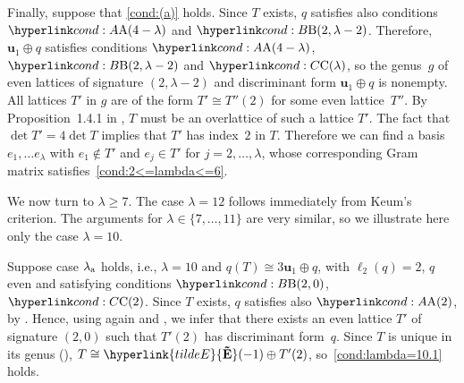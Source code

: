 \documentclass[a4paper]{amsart}
\theoremstyle{definition}
\theoremstyle{plain}
\DeclareMathOperator{\sign}{sign}
\newcommand{\bE}{\mathbf{E}}
\newcommand{\bU}{\mathbf{U}}
\newcommand{\bu}{\mathbf{u}}
\newcommand{\Etilde}{\hyperlink{tildeE}{\mathbf{\tilde{E}}}}
\begin{document}
Finally, suppose that \ref{cond:(a)} holds. 
Since \(T\) exists, \(q\) satisfies also conditions \(\condA{4 - \lambda}\) and \(\condB{2, \lambda - 2}\). Therefore, \(\bu_1 \oplus q\) satisfies conditions \(\condA{4 - \lambda}\), \(\condB{2, \lambda - 2}\) and \(\condC{\lambda}\), so the genus~\(g\) of even lattices of signature \((2, \lambda - 2)\) and discriminant form \(\bu_1\oplus q\) is nonempty.
All lattices \(T'\) in \(g\) are of the form \(T' \cong T''(2)\) for some even lattice~\(T''\).
By Proposition~1.4.1 in \cite{Nikulin:int.sym.bilinear.forms}, \(T\) must be an overlattice of such a lattice \(T'\). 
The fact that \(\det T' = 4 \det T\) implies that \(T'\) has index~\(2\) in \(T\). 
Therefore we can find a basis \(e_1, \ldots e_ \lambda\) with \(e_1 \notin T'\) and \(e_j \in T'\) for \(j = 2,\ldots, \lambda\), whose corresponding Gram matrix satisfies~\ref{cond:2<=lambda<=6}.

We now turn to \(\lambda \geq 7\).
The case \(\lambda = 12\) follows immediately from Keum's criterion.
The arguments for \(\lambda \in \{7,\ldots,11\}\) are very similar, so we illustrate here only the case \(\lambda = 10\).

Suppose case \(\lambda_{\rm a}\) holds, i.e., \(\lambda = 10\) and \(q(T) \cong 3\bu_1 \oplus q\), with \(\ell_2(q) = 2\), \(q\) even and satisfying conditions \(\condB{2, 0}\), \(\condC{2}\). 
Since \(T\) exists, \(q\) satisfies also \(\condA{2}\), by . 
Hence, using  again and , we infer that there exists an even lattice \(T'\) of signature \((2,0)\) such that \(T'(2)\) has discriminant form~\(q\). 
Since \(T\) is unique in its genus (), \(T \cong \Etilde(-1) \oplus T'(2)\), so~\ref{cond:lambda=10.1} holds.
\end{document}
